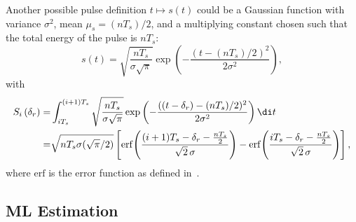 \noindent
Another possible pulse definition \(t\mapsto s(t)\) could be a Gaussian function with variance \(\sigma^2\), mean \(\mu_s = (nT_s)/2\), and a multiplying constant chosen such that the total energy of the pulse is \(nT_s\):
\begin{equation}
s(t)= \sqrt{\frac{nT_s}{\sigma\sqrt{\pi}}}
\exp\left(-\frac{(t-(nT_s)/2)^2}{2\sigma^2}\right),
\label{eq:gaussianpulse}
\end{equation}
with
\begin{equation}
\begin{aligned}
S_i\left(\delta_r\right)
= &\int_{iT_s}^{(i+1)T_s} \sqrt{\frac{nT_s}{\sigma\sqrt{\pi}}}
\exp\left(-\frac{((t-\delta_r)-(nT_s)/2)^2}{2\sigma^2}\right) \di t\\
= & \sqrt{{n T_s \sigma(\sqrt{\pi}}/{2}) }
\left[
\operatorname{erf}\!\left(\frac{(i+1)T_s-\delta_r-\tfrac{nT_s}{2}}{\sqrt{2}\,\sigma}\right)
-
\operatorname{erf}\!\left(\frac{iT_s-\delta_r-\tfrac{nT_s}{2}}{\sqrt{2}\,\sigma}\right)
\right],
\end{aligned}
\end{equation}
where \(\text{erf}\) is the error function as defined in~\cite{wiki:Error_function}.

\subsection{ML Estimation}\label{sub:MLestimation1}

